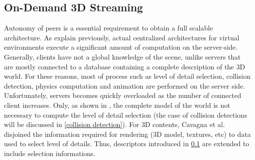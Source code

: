 \subsection{On-Demand 3D Streaming }
Autonomy of peers is a essential requirement to obtain a full scalable architecture. As explain previously, actual centralized architectures for virtual environments execute a significant amount of computation on the server-side.  Generally, clients have not a global knowledge of the scene, unlike servers that are mostly connected to a database containing a complete description of the 3D world. For these reasons, most of process such as level of detail selection,  collision detection, physics computation and animation are performed on the server side. Unfortunately, servers becomes quickly overloaded as the number of connected client increases. Only, as shown in \cite{Cavagna}, the complete model of the world is not necessary to compute the level of detail selection (the case of collision detections will be discussed in \ref{collision detection}). For 3D contents, Cavagna et al. disjoined the information required for rendering (3D model, textures, etc) to data used to select level of details. Thus, descriptors introduced in \ref{} are extended to include selection informations.     

   
